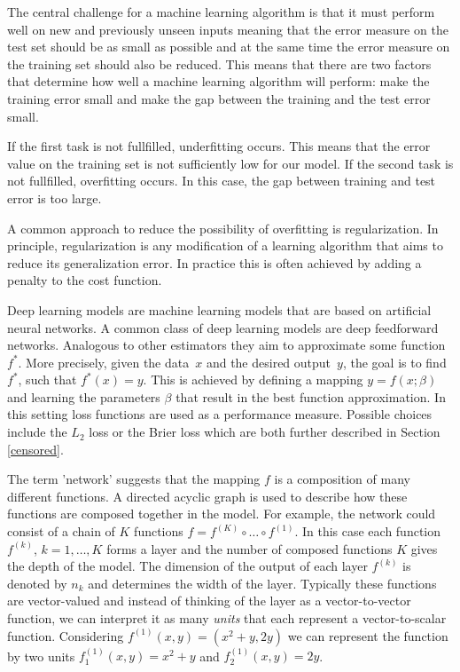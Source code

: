 \documentclass[12pt, a4paper]{scrartcl}
\theoremstyle{definition}
\theoremstyle{plain}
\numberwithin{equation}{section}
\numberwithin{figure}{section}
\numberwithin{table}{section}
\begin{document}

	The central challenge for a machine learning algorithm is that it must perform well on new and previously unseen inputs meaning that the error measure on the test set should be as small as possible and at the same time the error measure on the training set should also be reduced.
	This means that there are two factors that determine how well a machine learning algorithm will perform:
	make the training error small and make the gap between the training and the test error small.
	
	If the first task is not fullfilled, underfitting occurs. This means that the error value on the training set is not sufficiently low for our model.
	If the second task is not fullfilled, overfitting occurs. In this case, the gap between training and test error is too large.
	
	A common approach to reduce the possibility of overfitting is regularization.
	In principle, regularization is any modification of a learning algorithm that aims to reduce its generalization error.
	In practice this is often achieved by adding a penalty to the cost function.
	
	Deep learning models are machine learning models that are based on artificial neural networks.
	A common class of deep learning models are deep feedforward networks. Analogous to other estimators they aim to approximate some function~$f^*$.
	More precisely, given the data~$x$ and the desired output~$y$, the goal is to find $f^*$, such that $f^*(x)=y$.
	This is achieved by defining a mapping $y = f(x; \beta)$ and learning the parameters $\beta$ that result in the best function approximation.
	In this setting loss functions are used as a performance measure.
	Possible choices include the $L_2$ loss or the Brier loss which are both further described in Section \ref{censored}.
	
	The term 'network' suggests that the mapping $f$ is a composition of many different functions.
	A directed acyclic graph is used to describe how these functions are composed together in the model.
	For example, the network could consist of a chain of $K$ functions $ f = f^{(K)}\circ \dots \circ f^{(1)}$.
	In this case each function~$f^{(k)}$, $k=1,\dots,K$ forms a layer and the number of composed functions $K$ gives the depth of the model.
	The dimension of the output of each layer $f^{(k)}$ is denoted by $n_k$ and determines the width of the layer.
	Typically these functions are vector-valued and instead of thinking of the layer as a vector-to-vector function, we can interpret it as many \emph{units} that each represent a vector-to-scalar function.
	Considering $f^{(1)}(x,y)= (x^2+y,2y)$ we can represent the function by two units $f^{(1)}_1 (x,y) = x^2+y$ and $f^{(1)}_2(x,y) = 2y$.
	
\end{document}
